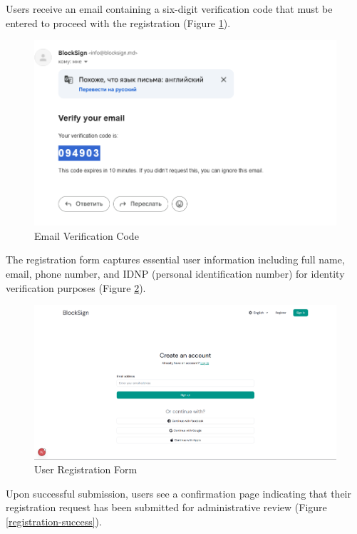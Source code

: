 Users receive an email containing a six-digit verification code that must be entered to proceed with the registration (Figure \ref{registration-email}).

\begin{figure}[H]
    \centering
    \includegraphics[width=18cm]{"images/siteUI/codeMail.png"}
    \caption{Email Verification Code}
    \label{registration-email}
\end{figure}

The registration form captures essential user information including full name, email, phone number, and IDNP (personal identification number) for identity verification purposes (Figure \ref{registration-form}).

\begin{figure}[H]
    \centering
    \includegraphics[width=18cm]{"images/siteUI/register.png"}
    \caption{User Registration Form}
    \label{registration-form}
\end{figure}

Upon successful submission, users see a confirmation page indicating that their registration request has been submitted for administrative review (Figure \ref{registration-success}).

